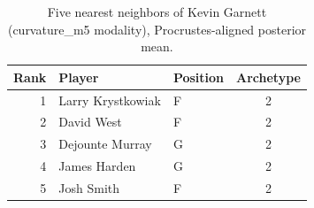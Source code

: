 \begin{table}[htbp]
  \centering\small
  \begin{tabular}{rllc}
    \toprule
    Rank & Player & Position & Archetype \\
    \midrule
    1 & Larry Krystkowiak & F & 2 \\
    2 & David West & F & 2 \\
    3 & Dejounte Murray & G & 2 \\
    4 & James Harden & G & 2 \\
    5 & Josh Smith & F & 2 \\
    \bottomrule
  \end{tabular}
  \caption{Five nearest neighbors of Kevin Garnett (curvature_m5 modality), Procrustes-aligned posterior mean.}
  \label{tab:Kevin_Garnett_neighbors_curvature_m5}
\end{table}

